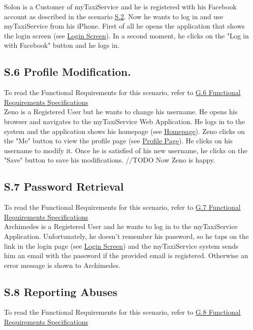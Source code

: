 		\label{sec:CustomerFacebookLoginScenario}
		Solon is a Customer of myTaxiService and he is registered with his Facebook account as described in the scenario \hyperref[sec:FacebookCustomerRegistrationScenario]{S.2}. Now he wants to log in and use myTaxiService from his iPhone.
		First of all he opens the application that shows the login screen (see \hyperref[login_m]{Login Screen}). In a second moment, he clicks on the "Log in with Facebook" button and he logs in.

		\subsection{S.6 Profile Modification.}\label{sec:RegisteredUserProfileModificationScenario}
		To read the Functional Requirements for this scenario, refer to \hyperref[sec:frs6]{G.6 Functional Requirements Specifications}\\

		Zeno is a Registered User but he wants to change his username. He opens his browser and navigates to the myTaxiService Web Application. He logs in to the system and the application shows his homepage (see \hyperref[chome_m]{Homepage}). Zeno clicks on the "Me" button to view the profile page (see \hyperref[cpersonalPage_m]{Profile Page}). He clicks on his username to modify it. Once he is satisfied of his new username, he clicks on the "Save" button to save his modifications. //TODO Now Zeno is happy.

		\subsection{S.7 Password Retrieval}\label{sec:PasswordRetrievalScenario}
		To read the Functional Requirements for this scenario, refer to \hyperref[sec:frs7]{G.7 Functional Requirements Specifications}\\

		Archimedes is a Registered User and he wants to log in to the myTaxiService Application. Unfortunately, he doesn't remember his password, so he taps on the link in the login page (see \hyperref[login_m]{Login Screen}) and the myTaxiService system sends him an email with the password if the provided email is registered. Otherwise an error message is shown to Archimedes.

		\subsection{S.8 Reporting Abuses}\label{sec:ReportingAbusesScenario}
		To read the Functional Requirements for this scenario, refer to \hyperref[sec:frs8]{G.8 Functional Requirements Specifications}\\

